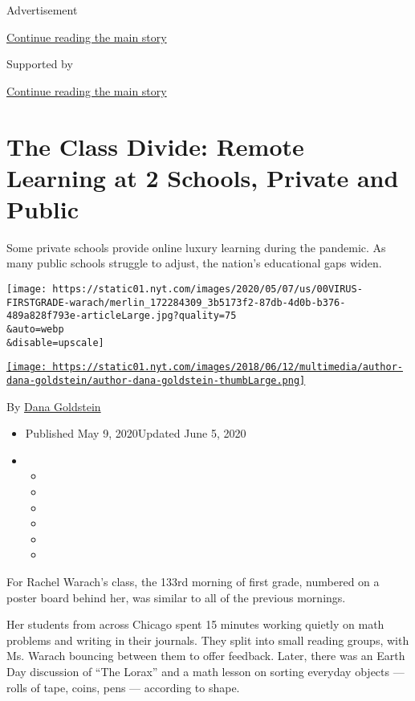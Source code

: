 Advertisement

\protect\hyperlink{after-top}{Continue reading the main story}

Supported by

\protect\hyperlink{after-sponsor}{Continue reading the main story}

\hypertarget{the-class-divide-remote-learning-at-2-schools-private-and-public}{%
\section{The Class Divide: Remote Learning at 2 Schools, Private and
Public}\label{the-class-divide-remote-learning-at-2-schools-private-and-public}}

Some private schools provide online luxury learning during the pandemic.
As many public schools struggle to adjust, the nation's educational gaps
widen.

\texttt{[image: https://static01.nyt.com/images/2020/05/07/us/00VIRUS-FIRSTGRADE-warach/merlin\_172284309\_3b5173f2-87db-4d0b-b376-489a828f793e-articleLarge.jpg?quality=75\\\&auto=webp\\\&disable=upscale]}

\href{https://www.nytimes.com/by/dana-goldstein}{\texttt{[image: https://static01.nyt.com/images/2018/06/12/multimedia/author-dana-goldstein/author-dana-goldstein-thumbLarge.png]}}

By \href{https://www.nytimes.com/by/dana-goldstein}{Dana Goldstein}

\begin{itemize}
\item
  Published May 9, 2020Updated June 5, 2020
\item
  \begin{itemize}
  \item
  \item
  \item
  \item
  \item
  \item
  \end{itemize}
\end{itemize}

For Rachel Warach's class, the 133rd morning of first grade, numbered on
a poster board behind her, was similar to all of the previous mornings.

Her students from across Chicago spent 15 minutes working quietly on
math problems and writing in their journals. They split into small
reading groups, with Ms. Warach bouncing between them to offer feedback.
Later, there was an Earth Day discussion of ``The Lorax'' and a math
lesson on sorting everyday objects --- rolls of tape, coins, pens ---
according to shape.


